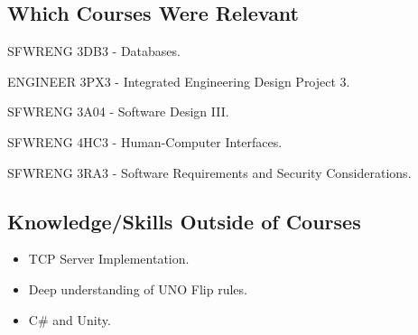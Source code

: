 \documentclass{article}
\begin{document}
\subsection{Which Courses Were Relevant}

\item SFWRENG 3DB3 - Databases.
\item ENGINEER 3PX3 - Integrated Engineering Design Project 3.
\item SFWRENG 3A04 - Software Design III.
\item SFWRENG 4HC3 - Human-Computer Interfaces.
\item SFWRENG 3RA3 - Software Requirements and Security Considerations.

\subsection{Knowledge/Skills Outside of Courses}

 \begin{itemize}
     \item TCP Server Implementation.
     \item Deep understanding of UNO Flip rules.
     \item C# and Unity.
 \end{itemize}
\end{document}
